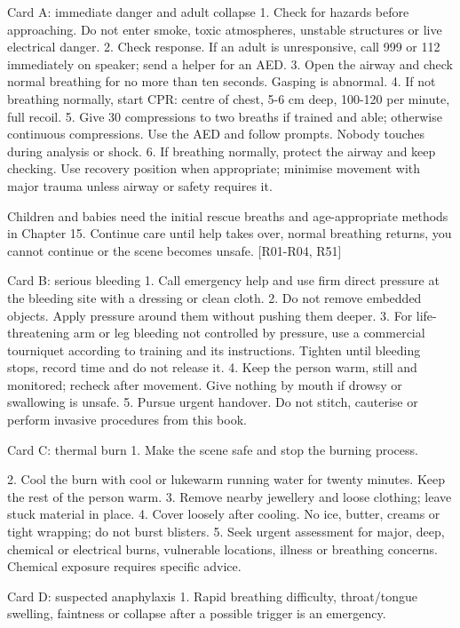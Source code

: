 \documentclass[10pt,openright]{book}
\begin{document}
Card A: immediate danger and adult collapse 1. Check for hazards before approaching. Do not enter smoke, toxic atmospheres, unstable structures or live electrical danger. 2. Check response. If an adult is unresponsive, call 999 or 112 immediately on speaker; send a helper for an AED. 3. Open the airway and check normal breathing for no more than ten seconds. Gasping is abnormal. 4. If not breathing normally, start CPR: centre of chest, 5-6 cm deep, 100-120 per minute, full recoil. 5. Give 30 compressions to two breaths if trained and able; otherwise continuous compressions. Use the AED and follow prompts. Nobody touches during analysis or shock. 6. If breathing normally, protect the airway and keep checking. Use recovery position when appropriate; minimise movement with major trauma unless airway or safety requires it.

Children and babies need the initial rescue breaths and age-appropriate methods in Chapter 15. Continue care until help takes over, normal breathing returns, you cannot continue or the scene becomes unsafe. [R01-R04, R51]

Card B: serious bleeding 1. Call emergency help and use firm direct pressure at the bleeding site with a dressing or clean cloth. 2. Do not remove embedded objects. Apply pressure around them without pushing them deeper. 3. For life-threatening arm or leg bleeding not controlled by pressure, use a commercial tourniquet according to training and its instructions. Tighten until bleeding stops, record time and do not release it. 4. Keep the person warm, still and monitored; recheck after movement. Give nothing by mouth if drowsy or swallowing is unsafe. 5. Pursue urgent handover. Do not stitch, cauterise or perform invasive procedures from this book.

Card C: thermal burn 1. Make the scene safe and stop the burning process.

2. Cool the burn with cool or lukewarm running water for twenty minutes. Keep the rest of the person warm. 3. Remove nearby jewellery and loose clothing; leave stuck material in place. 4. Cover loosely after cooling. No ice, butter, creams or tight wrapping; do not burst blisters. 5. Seek urgent assessment for major, deep, chemical or electrical burns, vulnerable locations, illness or breathing concerns. Chemical exposure requires specific advice.

Card D: suspected anaphylaxis 1. Rapid breathing difficulty, throat/tongue swelling, faintness or collapse after a possible trigger is an emergency.
\end{document}
